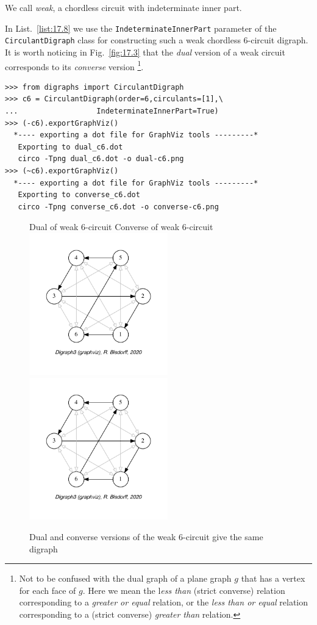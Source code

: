 We call \emph{weak}, a chordless circuit with indeterminate inner part.

In List.~\vref{list:17.8} we use the \texttt{IndeterminateInnerPart} parameter of the \texttt{Cir\-culantDigraph} class for constructing such a weak chordless 6-circuit digraph. It is worth noticing in Fig.~\vref{fig:17.3} that the \emph{dual} version of a weak circuit corresponds to its \emph{converse} version \footnote{Not to be confused with the dual graph of a plane graph $g$ that has a vertex for each face of $g$. Here we mean the l\emph{ess than} (strict converse) relation corresponding to a \emph{greater or equal} relation, or the \emph{less than or equal} relation corresponding to a (strict converse) \emph{greater than} relation.}.
\begin{lstlisting}[caption={The weak 6-circuit digraph},label=list:17.8]
>>> from digraphs import CirculantDigraph
>>> c6 = CirculantDigraph(order=6,circulants=[1],\
...                  IndeterminateInnerPart=True)
>>> (-c6).exportGraphViz()
  *---- exporting a dot file for GraphViz tools ---------*
   Exporting to dual_c6.dot
   circo -Tpng dual_c6.dot -o dual-c6.png
>>> (~c6).exportGraphViz()
  *---- exporting a dot file for GraphViz tools ---------*
   Exporting to converse_c6.dot
   circo -Tpng converse_c6.dot -o converse-c6.png 
\end{lstlisting}
\begin{figure}[h]
  Dual of weak 6-circuit \hfill Converse of weak 6-circuit\\
  \includegraphics[width=6cm]{Figures/17-3-dual-c6.pdf}\hfill
  \includegraphics[width=6cm]{Figures/17-3-converse-c6.pdf}
\caption{Dual and converse versions of the weak 6-circuit give the same digraph}
\label{fig:17.3}       %
\end{figure}

